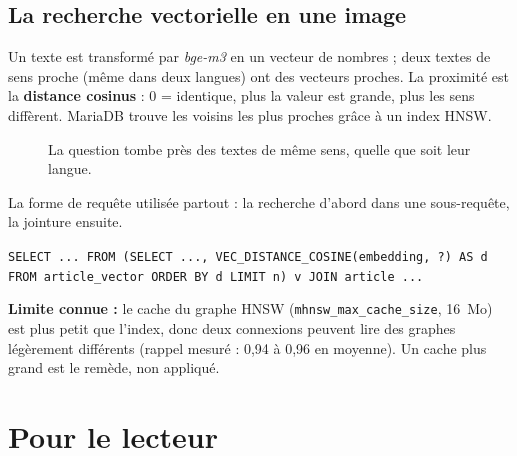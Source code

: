 \documentclass[11pt,a4paper]{article}
\newcommand{\sql}[1]{\texttt{\small #1}}
\begin{document}
\subsection{La recherche vectorielle en une image}
Un texte est transformé par \emph{bge-m3} en un vecteur de nombres ; deux textes de sens proche (même dans deux langues) ont des vecteurs proches. La proximité est la \textbf{distance cosinus} : 0 = identique, plus la valeur est grande, plus les sens diffèrent. MariaDB trouve les voisins les plus proches grâce à un index HNSW.

\begin{figure}[H]\centering
{}
\caption{La question tombe près des textes de même sens, quelle que soit leur langue.}
\end{figure}

La forme de requête utilisée partout : la recherche d'abord dans une sous-requête, la jointure ensuite.
\begin{center}\sql{SELECT ... FROM (SELECT ..., VEC\_DISTANCE\_COSINE(embedding, ?) AS d FROM article\_vector ORDER BY d LIMIT n) v JOIN article ...}\end{center}
\textbf{Limite connue :} le cache du graphe HNSW (\texttt{mhnsw\_max\_cache\_size}, 16~Mo) est plus petit que l'index, donc deux connexions peuvent lire des graphes légèrement différents (rappel mesuré : 0,94 à 0,96 en moyenne). Un cache plus grand est le remède, non appliqué.

\section{Pour le lecteur}
\end{document}
